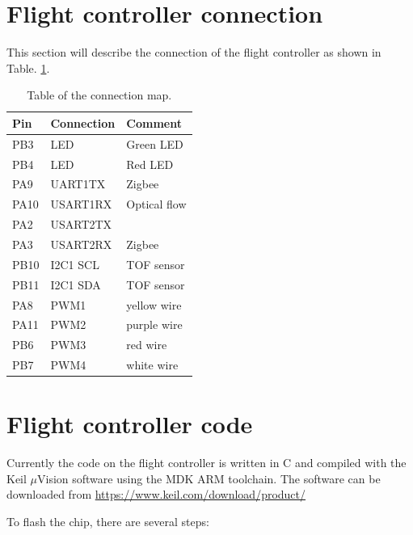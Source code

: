 \documentclass[idxtotoc,hyperref,openany]{labbook} %
\begin{document}
\section{Flight controller connection}

This section will describe the connection of the flight controller as shown in Table. \ref{tab_wiremap}. 


\begin{table}[h!]
\centering
\caption{Table of the connection map.}\label{tab_wiremap}
\begin{tabular}{l|l|l}
\hline
Pin & Connection & Comment\\\hline
PB3 & LED & Green LED\\\hline
PB4 & LED & Red LED\\\hline
PA9 & UART1TX & Zigbee \\\hline
PA10 & USART1RX & Optical flow \\\hline
PA2 & USART2TX & \ \\\hline
PA3 & USART2RX & Zigbee \\\hline
PB10 & I2C1 SCL & TOF sensor\\\hline
PB11 & I2C1 SDA & TOF sensor\\\hline
PA8 & PWM1 & yellow wire\\\hline
PA11 & PWM2 & purple wire\\\hline
PB6 & PWM3 & red wire\\\hline
PB7 & PWM4 & white wire\\\hline
\end{tabular}
\end{table}
\section{Flight controller code}

Currently the code on the flight controller is written in C and compiled with the Keil $\mu$Vision software using the MDK ARM toolchain. The software can be downloaded from \url{https://www.keil.com/download/product/}


To flash the chip, there are several steps:
\end{document}
